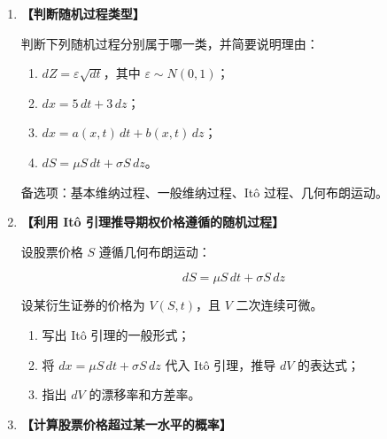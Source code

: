 \documentclass{article}
\begin{document}
\begin{enumerate}[label=\textbf{\arabic*.}]
设 \(\eta\) 为 \(t\) 与 \(T\) 之间的连续复利年收益：

\[
\eta = \frac{1}{T-t} \ln \frac{S_T}{S}
\]

\begin{enumerate}[label=(\arabic*)]
    \item 写出 \(\eta\) 服从的正态分布的均值；
    \item 写出 \(\eta\) 服从的正态分布的标准差；
    \item 若 \(\sigma = 0.40\)，时间间隔 \(T - t = 1\) 年，重新计算 \(\eta\) 的均值和标准差。
\end{enumerate}



\item  {\bf{【判断随机过程类型】}} %

判断下列随机过程分别属于哪一类，并简要说明理由：

\begin{enumerate}[label=(\arabic*)]
    \item \(dZ = \varepsilon \sqrt{dt}\)，其中 \(\varepsilon \sim N(0,1)\)；
    \item \(dx = 5 \, dt + 3 \, dz\)；
    \item \(dx = a(x,t) \, dt + b(x,t) \, dz\)；
    \item \(dS = \mu S \, dt + \sigma S \, dz\)。
\end{enumerate}

备选项：基本维纳过程、一般维纳过程、Itô 过程、几何布朗运动。




\item  {\bf{【利用 Itô 引理推导期权价格遵循的随机过程】}} %

设股票价格 \(S\) 遵循几何布朗运动：

\[
dS = \mu S \, dt + \sigma S \, dz
\]

设某衍生证券的价格为 \(V(S,t)\)，且 \(V\) 二次连续可微。

\begin{enumerate}[label=(\arabic*)]
    \item 写出 Itô 引理的一般形式；
    \item 将 \(dx = \mu S \, dt + \sigma S \, dz\) 代入 Itô 引理，推导 \(dV\) 的表达式；
    \item 指出 \(dV\) 的漂移率和方差率。
\end{enumerate}



\item  {\bf{【计算股票价格超过某一水平的概率】}} %


\end{enumerate}
\end{document}
